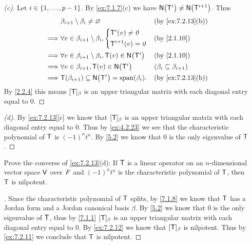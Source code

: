 \begin{proof}[(c)]
  Let \(i \in \left\lbrace1, \dots, p - 1\right\rbrace\).
  By \cref{ex:7.1.7}(c) we have \(\ns{\T^i} \neq \ns{\T^{i + 1}}\).
  Thus
  \begin{align*}
             & \beta_{i + 1} \setminus \beta_i \neq \varnothing                   &  & \by{ex:7.2.13}[b]                 \\
    \implies & \forall v \in \beta_{i + 1} \setminus \beta_i, \begin{dcases}
                                                                \T^i(v) \neq \zv \\
                                                                \T^{i + 1}(v) = \zv
                                                              \end{dcases}      &  & \by{2.1.10}                         \\
    \implies & \forall v \in \beta_{i + 1} \setminus \beta_i, \T(v) \in \ns{\T^i} &  & \by{2.1.10}                       \\
    \implies & \forall v \in \beta_{i + 1}, \T(v) \in \ns{\T^i}                   &  & (\beta_i \subseteq \beta_{i + 1}) \\
    \implies & \T(\beta_{i + 1}) \subseteq \ns{\T^i} = \spn{\beta_i}.             &  & \by{ex:7.2.13}[b]
  \end{align*}
  By \cref{2.2.4} this means \([\mathsf{T}]_{\beta}\) is an upper triangular matrix with each diagonal entry equal to \(0\).
\end{proof}

\begin{proof}[(d)]
  By \cref{ex:7.2.13}[c] we know that \([\mathsf{T}]_{\beta}\) is an upper triangular matrix with each diagonal entry equal to \(0\).
  Thus by \cref{ex:4.2.23} we see that the characteristic polynomial of \(\mathsf{T}\) is \((-1)^n t^n\).
  By \cref{5.2} we know that \(0\) is the only eigenvalue of \(\mathsf{T}\).
\end{proof}

\begin{ex}\label{ex:7.2.14}
  Prove the converse of \cref{ex:7.2.13}(d):
  If \(\mathsf{T}\) is a linear operator on an \(n\)-dimensional vector space \(\mathsf{V}\) over \(\mathit{F}\) and \((-1)^n t^n\) is the characteristic polynomial of \(\mathsf{T}\), then \(\mathsf{T}\) is nilpotent.
\end{ex}

\begin{proof}[]
  Since the characteristic polynomial of \(\mathsf{T}\) splits, by \cref{7.1.8} we know that \(\mathsf{T}\) has a Jordan form and a Jordan canonical basis \(\beta\).
  By \cref{5.2} we know that \(0\) is the only eigenvalue of \(\mathsf{T}\), thus by \cref{7.1.1} \([\mathsf{T}]_{\beta}\) is an upper triangular matrix with each diagonal entry equal to \(0\).
  By \cref{ex:7.2.12} we know that \([\mathsf{T}]_{\beta}\) is nilpotent.
  Thus by \cref{ex:7.2.11} we conclude that \(\mathsf{T}\) is nilpotent.
\end{proof}

